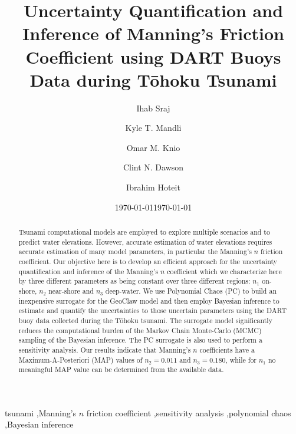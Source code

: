 \documentclass[review,12pt]{elsarticle}
\newcommand{\geoclaw}{{\sc GeoClaw}\xspace}
\newcommand{\tohoku}{T\={o}hoku\xspace}
\begin{document}
\ifpdf
{}
\else
{}
\fi

\begin{frontmatter}

\title{Uncertainty Quantification and Inference of Manning's Friction Coefficient using DART Buoys Data during
\tohoku Tsunami}
\date{\today}

\author[kaust1]{Ihab Sraj}
\author[ut]{Kyle T. Mandli}
\author[duke,kaust2]{Omar M. Knio}
\author[ut]{Clint N. Dawson}
\author[kaust1]{Ibrahim Hoteit}
\address[kaust1]{Division of Physical Sciences and Engineering, King Abdullah University for Science and Technology, Thuwal, Saudi Arabia}

\address[ut]{Institute for Computational Engineering and Science, University of Texas at Austin, 201 E 24th ST. Stop C0200, Austin, TX 78712-1229, USA}
\address[duke]{Department of Mechanical Engineering and Materials Science, Duke University, 144
Hudson Hall, Durham, North Carolina 27708, USA}
\address[kaust2]{Division of Computer, Electrical and Mathematical Sciences and Engineering, King Abdullah University for Science and Technology, Thuwal, Saudi Arabia}
\date{\today}

\begin{abstract}

Tsunami computational models are employed to explore multiple
scenarios and to predict water elevations.  However, accurate estimation of
water elevations  requires accurate estimation of many model parameters, in
particular the Manning's $n$ friction coefficient.  Our objective here is to
develop an efficient approach for the  uncertainty quantification and inference
of the Manning's $n$ coefficient which we characterize here by three different
parameters as being constant over three different regions: $n_1$ on-shore,
$n_2$ near-shore and $n_3$ deep-water.  We use Polynomial Chaos (PC) to build an
inexpensive surrogate for the  \geoclaw model and then employ Bayesian inference
to estimate  and quantify the uncertainties to those uncertain parameters using
the DART buoy data collected during the \tohoku tsunami.  The surrogate model
significantly reduces the computational burden of the Markov Chain Monte-Carlo
(MCMC)  sampling of the Bayesian inference. The PC surrogate is also used to
perform a sensitivity analysis.  Our results indicate that Manning's $n$
coefficients have a Maximum-A-Posteriori (MAP) values of $n_2=0.011$ and
$n_3=0.180$, while for $n_1$ no meaningful MAP value can be determined from the
available data.

\end{abstract}

\begin{keyword}
tsunami \sep Manning's $n$ friction coefficient \sep sensitivity analysis \sep polynomial chaos \sep Bayesian inference
\end{keyword}

\end{frontmatter}
\linenumbers
\end{document}
